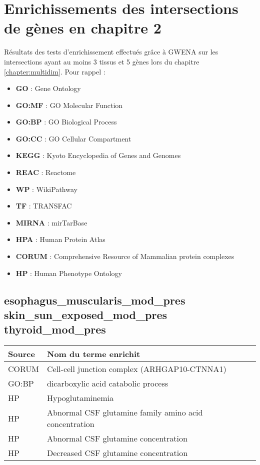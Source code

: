 \chapter{Enrichissements des intersections de gènes en chapitre 2}
\label{annexe:chap_2_genes_intersect_enrichments}

Résultats des tests d'enrichissement effectués grâce à GWENA sur les intersections ayant au moins 3 tissus et 5 gènes lors du chapitre \ref{chapter:multidim}. Pour rappel :
\begin{itemize}
    \item{\textbf{GO} : Gene Ontology}
    \item{\textbf{GO:MF} : GO Molecular Function}
    \item{\textbf{GO:BP} : GO Biological Process}
    \item{\textbf{GO:CC} : GO Cellular Compartment}
    \item{\textbf{KEGG} : Kyoto Encyclopedia of Genes and Genomes}
    \item{\textbf{REAC} : Reactome}
    \item{\textbf{WP} : WikiPathway}
    \item{\textbf{TF} : TRANSFAC}
    \item{\textbf{MIRNA} : mirTarBase}
    \item{\textbf{HPA} : Human Protein Atlas}
    \item{\textbf{CORUM} : Comprehensive Resource of Mammalian protein complexes}
    \item{\textbf{HP} : Human Phenotype Ontology}
\end{itemize}


\section*{esophagus\_muscularis\_mod\_pres \newline skin\_sun\_exposed\_mod\_pres \newline thyroid\_mod\_pres}

\begin{longtable}{ll}
\toprule
Source & Nom du terme enrichit\\
\midrule
CORUM & Cell-cell junction complex (ARHGAP10-CTNNA1)\\
GO:BP & dicarboxylic acid catabolic process\\
HP & Hypoglutaminemia\\
HP & Abnormal CSF glutamine family amino acid concentration\\
HP & Abnormal CSF glutamine concentration\\
HP & Decreased CSF glutamine concentration\\
\bottomrule
\end{longtable}

